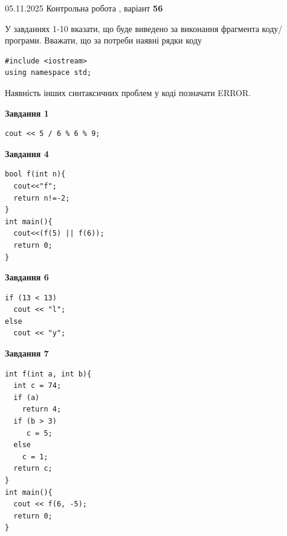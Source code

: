 \documentclass[12pt, ukrainian]{article}
\begin{document}
{\Large{05.11.2025 Контрольна робота , варіант  \No \textbf { 56 }\par}}
{
\begin {large}
У завданнях 1-10 вказати, що буде виведено за виконання фрагмента коду/про\-гра\-ми.
Вважати, що за потреби наявні рядки коду
\begin{verbatim}
#include <iostream>
using namespace std;
\end{verbatim}
Наявність інших синтаксичних проблем у коді позначати ERROR.

\begin{minipage}[t]{7.0cm}

\begin{center}
\textbf{Завдання 1}
\end{center}
\vspace{-8mm}

\begin{verbatim}
cout << 5 / 6 % 6 % 9;
\end{verbatim}



\begin{center}
\textbf{Завдання 4}
\end{center}
\vspace{-8mm}

\begin{verbatim}
bool f(int n){
  cout<<"f";
  return n!=-2;
}
int main(){
  cout<<(f(5) || f(6));
  return 0;
}
\end{verbatim}



\begin{center}
\textbf{Завдання 6}
\end{center}
\vspace{-8mm}

\begin{verbatim}
if (13 < 13)
  cout << "l";
else
  cout << "y";
\end{verbatim}



\begin{center}
\textbf{Завдання 7}
\end{center}
\vspace{-8mm}

\begin{verbatim}
int f(int a, int b){
  int c = 74;
  if (a)
    return 4;
  if (b > 3)
     c = 5;
  else
    c = 1;
  return c;
}
int main(){
  cout << f(6, -5);
  return 0;
}
\end{verbatim}


\end{minipage}
\end{large}}
\end{document}
